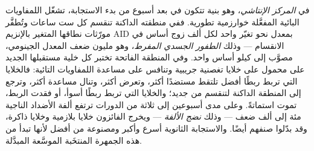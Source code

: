 \begin{definition}\label{def:b3:adaptive-immunity:germinal-centre}
في \emph{المركز الإنتاشي}، وهو بنية تتكون في  بعد
أسبوع من بدء الاستجابة، تشغّل اللمفاويات البائية المفعَّلة
خوارزمية تطورية. ففي منطقته الداكنة تنقسم كل ست ساعات
وتُطفَّر مورّثات نطاقها المتغير بالإنزيم AID بمعدل نحو
تغيّر واحد لكل ألف زوج أساس في الانقسام --- وذلك
\emph{الطفور الجسدي المفرط}، وهو مليون ضعف المعدل الجينومي،
مصوَّب إلى كيلو أساس واحد. وفي المنطقة الفاتحة تختبر كل
خلية مستقبلها الجديد على  محمول على خلايا تغصنية
جريبية وتنافس على مساعدة اللمفاويات التائية: فالخلايا التي
تربط ربطًا أفضل تلتقط مستضدًا أكثر، وتعرض أكثر، وتنال
مساعدة أكثر، وترجع إلى المنطقة الداكنة لتنقسم من جديد؛
والخلايا التي تربط ربطًا أسوأ، أو فقدت الربط، تموت
استماتةً. وعلى مدى أسبوعين إلى ثلاثة من الدورات ترتفع ألفة
الأضداد الناجية مئة إلى ألف ضعف --- وذلك \emph{نضج الألفة}
--- ويخرج الفائزون خلايا بلازمية وخلايا ذاكرة، وقد بدّلوا
صنفهم أيضًا. والاستجابة الثانوية أسرع وأكبر ومصنوعة من 
أفضل لأنها تبدأ من هذه الجمهرة المنتخَبة الموسَّعة
المبدَّلة.
\end{definition}

